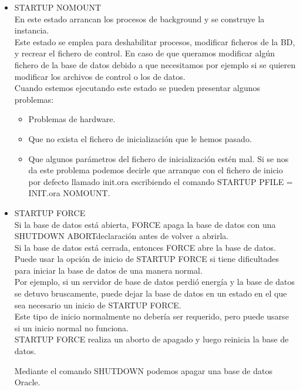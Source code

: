 \begin{itemize}
\begin{itemize}
		\end{itemize}
	\item STARTUP NOMOUNT
	\\En este estado arrancan los procesos de background y se construye la instancia.
	\\Este estado se emplea para deshabilitar procesos, modificar ficheros de la BD, y recrear el
	fichero de control. En caso de que queramos modificar algún fichero de la base de datos debido a
	que necesitamos por ejemplo si se quieren modificar los archivos de control o los de datos.
	\\Cuando estemos ejecutando este estado se pueden presentar algunos problemas:		
		\begin{itemize}
			\item Problemas de hardware.
			\item Que no exista el fichero de inicialización que le hemos pasado.
			\item Que algunos parámetros del fichero de inicialización estén mal. Si se nos da este
			problema podemos decirle que arranque con el fichero de inicio por defecto llamado	
			init.ora escribiendo el comando STARTUP PFILE = INIT.ora NOMOUNT.			
		\end{itemize}
	\item STARTUP FORCE
	\\Si la base de datos está abierta, FORCE apaga la base de datos con una SHUTDOWN ABORTdeclaración antes de volver a abrirla. 
	\\Si la base de datos está cerrada, entonces FORCE  abre la base de datos.
	\\Puede usar la opción de inicio de STARTUP FORCE si tiene dificultades para iniciar la base de datos de una manera normal. 
	\\Por ejemplo, si un servidor de base de datos perdió energía y la base de datos se detuvo bruscamente, puede dejar la base de datos en un estado en 		el que sea necesario un inicio de STARTUP FORCE. 
	\\Este tipo de inicio normalmente no debería ser requerido, pero puede usarse si un inicio normal no funciona. 
	\\STARTUP FORCE realiza un aborto de apagado y luego reinicia la base de datos.

\vspace*{0.20in}
\vspace*{0.1in}
\begin{large}
Mediante el comando SHUTDOWN podemos apagar una base de datos Oracle. \\
\end{large}


\end{itemize}
